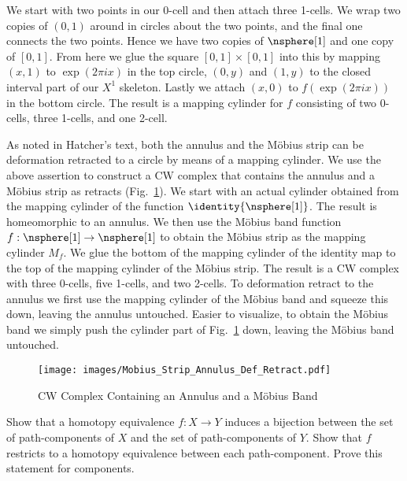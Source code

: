 \documentclass{article}                                                        %
\begin{document}
    \begin{solution}
        We start with two points in our 0-cell and then attach three 1-cells.
        We wrap two copies of $(0,1)$ around in circles about the two points,
        and the final one connects the two points. Hence we have two copies of
        $\nsphere[1]$ and one copy of $[0,1]$. From here we glue the square
        $[0,1]\times[0,1]$ into this by mapping $(x,1)$ to $\exp(2\pi{i}x)$ in
        the top circle, $(0,y)$ and $(1,y)$ to the closed interval part of our
        $X^{1}$ skeleton. Lastly we attach $(x,0)$ to $f(\exp(2\pi{i}x))$ in
        the bottom circle. The result is a mapping cylinder for $f$ consisting
        of two 0-cells, three 1-cells, and one 2-cell.
        \par\hfill\par
        As noted in Hatcher's text, both the annulus and the M\"{o}bius strip
        can be deformation retracted to a circle by means of a mapping cylinder.
        We use the above assertion to construct a CW complex that contains the
        annulus and a M\"{o}bius strip as retracts
        (Fig.~\ref{fig:CW_Comp_Annulus_Mobius}). We start with an actual
        cylinder obtained from the mapping cylinder of the function
        $\identity{\nsphere[1]}$. The result is homeomorphic to an annulus. We
        then use the M\"{o}bius band function
        $f:\nsphere[1]\rightarrow\nsphere[1]$ to obtain the M\"{o}bius strip as
        the mapping cylinder $M_{f}$. We glue the bottom of the mapping cylinder
        of the identity map to the top of the mapping cylinder of the M\"{o}bius
        strip. The result is a CW complex with three 0-cells, five 1-cells, and
        two 2-cells. To deformation retract to the annulus we first use the
        mapping cylinder of the M\"{o}bius band and squeeze this down, leaving
        the annulus untouched. Easier to visualize, to obtain the M\"{o}bius
        band we simply push the cylinder part of
        Fig.~\ref{fig:CW_Comp_Annulus_Mobius} down, leaving the M\"{o}bius band
        untouched.
    \end{solution}
    \begin{figure}[H]
        \centering
        \captionsetup{type=figure}
        \texttt{[image: images/Mobius\_Strip\_Annulus\_Def\_Retract.pdf]}
        \caption{CW Complex Containing an Annulus and a M\"{o}bius Band}
        \label{fig:CW_Comp_Annulus_Mobius}
    \end{figure}
    \begin{problem}
        Show that a homotopy equivalence $f:X\rightarrow{Y}$ induces a bijection
        between the set of path-components of $X$ and the set of path-components
        of $Y$. Show that $f$ restricts to a homotopy equivalence between each
        path-component. Prove this statement for components.
    \end{problem}
\end{document}
